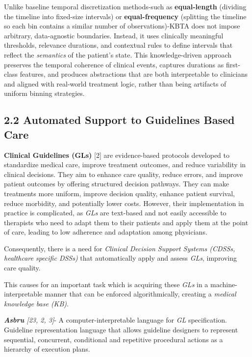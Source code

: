 \documentclass[
]{article}
\begin{document}
Unlike baseline temporal discretization methods-such as
\textbf{equal-length} (dividing the timeline into fixed-size intervals)
or \textbf{equal-frequency} (splitting the timeline so each bin contains
a similar number of observations)-KBTA does not impose arbitrary,
data-agnostic boundaries. Instead, it uses clinically meaningful
thresholds, relevance durations, and contextual rules to define
intervals that reflect the \emph{semantics} of the patient's state. This
knowledge-driven approach preserves the temporal coherence of clinical
events, captures durations as first-class features, and produces
abstractions that are both interpretable to clinicians and aligned with
real-world treatment logic, rather than being artifacts of uniform
binning strategies.

\subsection{2.2 Automated Support to Guidelines Based
Care}\label{automated-support-to-guidelines-based-care}

\textbf{Clinical Guidelines (GLs)} {[}2{]} are evidence-based protocols
developed to standardize medical care, improve treatment outcomes, and
reduce variability in clinical decisions. They aim to enhance care
quality, reduce errors, and improve patient outcomes by offering
structured decision pathways. They can make treatments more uniform,
improve decision quality, enhance patient survival, reduce morbidity,
and potentially lower costs. However, their implementation in practice
is complicated, as \emph{GLs} are text-based and not easily accessible
to therapists who need to adapt them to their patients and apply them at
the point of care, leading to low adherence and adaptation among
physicians.

Consequently, there is a need for \emph{Clinical Decision Support
Systems (CDSSs, healthcare specific DSSs)} that automatically apply and
assess \emph{GLs}, improving care quality.

This causes for an important task which is acquiring these \emph{GLs} in
a machine-interpretable manner that can be enforced algorithmically,
creating a \emph{medical knowledge base (KB)}.

\emph{\textbf{Asbru} {[}23, 2, 3{]}}- A computer-interpretable language
for \emph{GL} specification. Guideline representation language that
allows guideline designers to represent sequential, concurrent,
conditional and repetitive procedural actions as a hierarchy of
execution plans.
\end{document}
